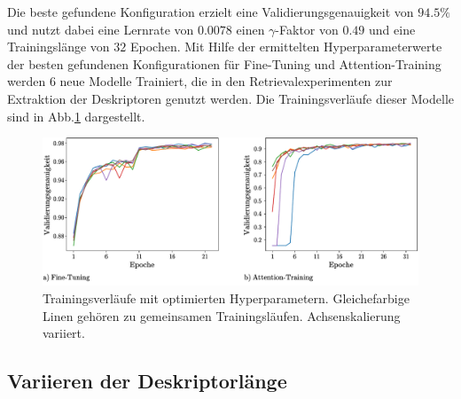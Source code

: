 Die beste gefundene Konfiguration erzielt eine Validierungsgenauigkeit von $94.5\%$ und nutzt dabei eine Lernrate von $0.0078$ einen $\gamma$-Faktor von $0.49$ und eine Trainingslänge von $32$ Epochen. 
Mit Hilfe der ermittelten Hyperparameterwerte der besten gefundenen Konfigurationen für Fine-Tuning und Attention-Training werden $6$ neue Modelle Trainiert, die in den Retrievalexperimenten zur Extraktion der Deskriptoren genutzt werden. Die Trainingsverläufe dieser Modelle sind in Abb.\ref{optimized_runs} dargestellt.
\begin{figure}[h]
\includegraphics[scale=0.75]{NNOPT/6_model_verlauf}
\caption{Trainingsverläufe mit optimierten Hyperparametern. Gleichefarbige Linen gehören zu gemeinsamen Trainingsläufen. Achsenskalierung variiert.}
\label{optimized_runs}
\end{figure}

\subsection{Variieren der Deskriptorlänge}\label{pca_experiments}

